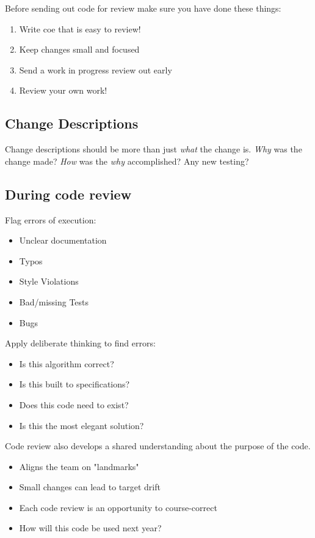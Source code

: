 \documentclass{article}
\begin{document}
\vspace*{1em}

Before sending out code for review make sure you have done these things:
\begin{enumerate}
    \item Write coe that is easy to review!
    \item Keep changes small and focused
    \item Send a work in progress review out early
    \item Review your own work!
\end{enumerate}

\subsection{Change Descriptions}
Change descriptions should be more than just \textit{what} the change is. \textit{Why} was the change made? \textit{How} was the \textit{why} accomplished? Any new testing?

\vspace*{1em}

\subsection{During code review}

Flag errors of execution:
\begin{itemize}
    \item Unclear documentation
    \item Typos
    \item Style Violations
    \item Bad/missing Tests
    \item Bugs
\end{itemize}

Apply deliberate thinking to find errors:
\begin{itemize}
    \item Is this algorithm correct?
    \item Is this built to specifications?
    \item Does this code need to exist?
    \item Is this the most elegant solution?
\end{itemize}

\vspace*{1em}

Code review also develops a shared understanding about the purpose of the code. 
\begin{itemize}
    \item Aligns the team on "landmarks"
    \item Small changes can lead to target drift
    \item Each code review is an opportunity to course-correct
    \item How will this code be used next year?
\end{itemize}
\end{document}
